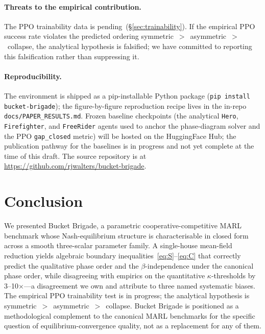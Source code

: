 \documentclass{anvil-paper}
\begin{document}
\paragraph{Threats to the empirical contribution.}
The PPO trainability data is pending~(\S\ref{sec:trainability}). If the
empirical PPO success rate violates the predicted ordering
\textsf{symmetric}~$>$~\textsf{asymmetric}~$>$~\textsf{collapse}, the
analytical hypothesis is falsified; we have committed to reporting this
falsification rather than suppressing it.

\paragraph{Reproducibility.}
The environment is shipped as a pip-installable Python package
(\texttt{pip install bucket-brigade}); the figure-by-figure reproduction
recipe lives in the in-repo \texttt{docs/PAPER\_RESULTS.md}.
Frozen baseline checkpoints (the analytical \texttt{Hero}, \texttt{Firefighter},
and \texttt{FreeRider} agents used to anchor the phase-diagram solver and
the PPO \texttt{gap\_closed} metric) will be hosted on the HuggingFace Hub;
the publication pathway for the baselines is in progress and not yet
complete at the time of this draft. The source repository is at
\url{https://github.com/rjwalters/bucket-brigade}.

\section*{Conclusion}

We presented Bucket Brigade, a parametric cooperative-competitive MARL
benchmark whose Nash-equilibrium structure is characterisable in closed form
across a smooth three-scalar parameter family. A single-house mean-field
reduction yields algebraic boundary inequalities~\eqref{eq:S}--\eqref{eq:C}
that correctly predict the qualitative phase order and the
$\beta$-independence under the canonical phase order, while disagreeing with
empirics on the quantitative $\kappa$-thresholds by 3--10$\times$---a
disagreement we own and attribute to three named systematic biases. The
empirical PPO trainability test is in progress; the analytical hypothesis is
\textsf{symmetric}~$>$~\textsf{asymmetric}~$>$~\textsf{collapse}. Bucket
Brigade is positioned as a methodological complement to the canonical MARL
benchmarks for the specific question of equilibrium-convergence quality, not
as a replacement for any of them.



\end{document}
